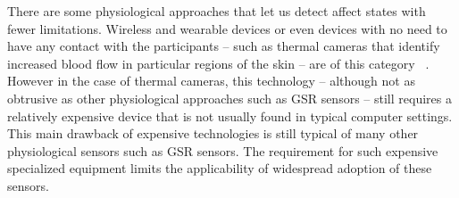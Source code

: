 There are some physiological approaches that let us detect affect states with fewer limitations. Wireless and wearable devices or even devices with no need to have any contact with the participants – such as thermal cameras that identify increased blood flow in particular regions of the skin – are of this category ~\cite{puri2005stresscam}. However in the case of thermal cameras, this technology – although not as obtrusive as other physiological approaches such as GSR sensors – still requires a relatively expensive device that is not usually found in typical computer settings. This main drawback of expensive technologies is still typical of many other physiological sensors such as GSR sensors. The requirement for such expensive specialized equipment limits the applicability of widespread adoption of these sensors.
